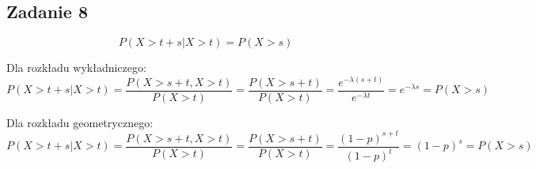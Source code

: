 \subsection{Zadanie 8}

$$
P(X > t+s | X > t ) = P(X > s)
$$

Dla rozkładu wykładniczego:
$$
P(X > t+s | X > t ) = \frac{P(X > s + t, X > t)}{P(X > t)} = \frac{P(X > s + t)}{P(X > t)} = \frac{e^{-\lambda(s + t)}}{e^{-\lambda t}} = e^{-\lambda s} = P(X > s)
$$

Dla rozkładu geometrycznego:
$$
P(X > t+s | X > t ) = \frac{P(X > s + t, X > t)}{P(X > t)} = \frac{P(X > s + t)}{P(X > t)} = \frac{(1-p)^{s + t}}{(1-p)^{t}} = (1-p)^{s} = P(X > s)
$$
